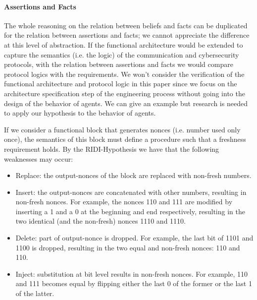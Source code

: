 \documentclass[conference]{IEEEtran}
\begin{document}
\paragraph{Assertions and Facts}
The whole reasoning on the relation between beliefs and facts can be duplicated
for the relation between assertions and facts; we cannot appreciate the
difference at this level of abstraction.  If the functional architecture would
be extended to capture the semantics (i.e. the logic) of the communication and
cybersecurity protocols, with the relation between assertions and facts we would
compare protocol logics with the requirements. We won't consider the verification of
the functional architecture and protocol logic in this paper since we
focus on the architecture specification step of the engineering process
without going into the design of the behavior of agents. We can give an example
but research is needed to apply our hypothesis
to the behavior of agents. 

If we consider a functional block that generates nonces (i.e. number used
only once), the semantics of this block must define a procedure such that 
a freshness requirement holds. By the RIDI-Hypothesis we have that
the following weaknesses may occur:
\begin{itemize}
	\item Replace: the output-nonces of the block are replaced with
		non-fresh numbers.
	\item Insert: the output-nonces are concatenated with other numbers,
		resulting in non-fresh nonces. For example, the nonces 110 and
		111 are modified by inserting a 1 and a 0 at the beginning and
		end respectively, resulting in the two identical (and the
		non-fresh) nonces 1110 and 1110.
	\item Delete: part of output-nonce is dropped. For example, the last bit of 1101 and 1100 is dropped, resulting in the two equal and non-fresh nonces: 110 and 110.
	\item Inject: substitution at bit level results in non-fresh nonces. For example, 110 and 111 becomes equal by flipping either the last 0 of the former or the last 1 of the latter.
\end{itemize}
\end{document}
